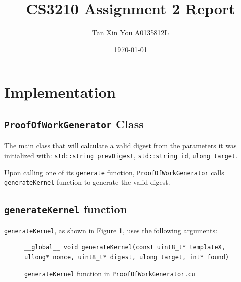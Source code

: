 \documentclass[a4paper]{article}
\title{CS3210 Assignment 2 Report}
\author{Tan Xin You A0135812L}
\date{\today}
\begin{document}
\maketitle

\section{Implementation}
\label{sec:introduction}
\subsection{\texttt{ProofOfWorkGenerator} Class}
The main class that will calculate a valid digest from the parameters it was initialized with: \texttt{std::string prevDigest}, \texttt{std::string id}, \texttt{ulong target}.

Upon calling one of its \texttt{generate} function, \texttt{ProofOfWorkGenerator} calls \texttt{generateKernel} function to generate the valid digest. 

\subsection{\texttt{generateKernel} function}
\texttt{generateKernel}, as shown in Figure \ref{fig:generate-kernel}, uses the following arguments:

\begin{figure}
\begin{lstlisting}
__global__ void generateKernel(const uint8_t* templateX, ullong* nonce, uint8_t* digest, ulong target, int* found)
\end{lstlisting}
\caption{\label{fig:generate-kernel} \texttt{generateKernel} function in \texttt{ProofOfWorkGenerator.cu}}
\end{figure}
\end{document}
